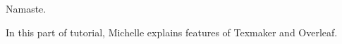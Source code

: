 \documentclass[11pt]{article}
\begin{document}
Namaste.

In this part of tutorial, Michelle explains features of Texmaker and Overleaf.
\end{document}
